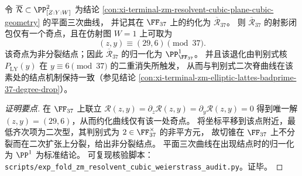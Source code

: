 \begin{conclusion}\label{con:xi-terminal-zm-resolvent-cubic-badprime-37-nonsplit-node}
令 \(\overline{\mathcal R}\subset \PP^{2}_{[Z:Y:W]}\) 为结论 \ref{con:xi-terminal-zm-resolvent-cubic-plane-cubic-geometry} 的平面三次曲线，
并记其在 \(\FF_{37}\) 上的约化为 \(\overline{\mathcal R}_{37}\)。
则 \(\overline{\mathcal R}_{37}\) 的射影闭包仅有一个奇点，且在仿射图 \(W=1\) 上可取为
\[
(z,y)\equiv (29,6)\pmod{37}.
\]
该奇点为非分裂结点；因此 \(\overline{\mathcal R}_{37}\) 的归一化为 \(\PP^{1}_{\FF_{37}}\)。
并且该退化由判别式核 \(P_{\mathrm{LY}}(y)\) 在 \(y\equiv 6\pmod{37}\) 的二重消失所触发，
从而与判别式二次脊曲线在该素处的结点机制保持一致（参见结论 \ref{con:xi-terminal-zm-elliptic-lattes-badprime-37-degree-drop}）。
\end{conclusion}
\begin{proof}[证明要点]
在 \(\FF_{37}\) 上联立
\(
\mathscr R(z,y)=\partial_{z}\mathscr R(z,y)=\partial_{y}\mathscr R(z,y)=0
\)
得到唯一解 \((z,y)=(29,6)\)，从而约化曲线仅有该一处奇点。
将坐标平移到该点附近，最低齐次项为二次型，其判别式为 \(2\in\FF_{37}^{\times}\) 的非平方元，
故切锥在 \(\FF_{37}\) 上不分裂而在二次扩张上分裂，给出非分裂结点。
平面三次曲线在出现结点时的归一化为 \(\PP^{1}\) 为标准结论。
可复现核验脚本：\texttt{scripts/exp\_fold\_zm\_resolvent\_cubic\_weierstrass\_audit.py}。证毕。
\end{proof}

